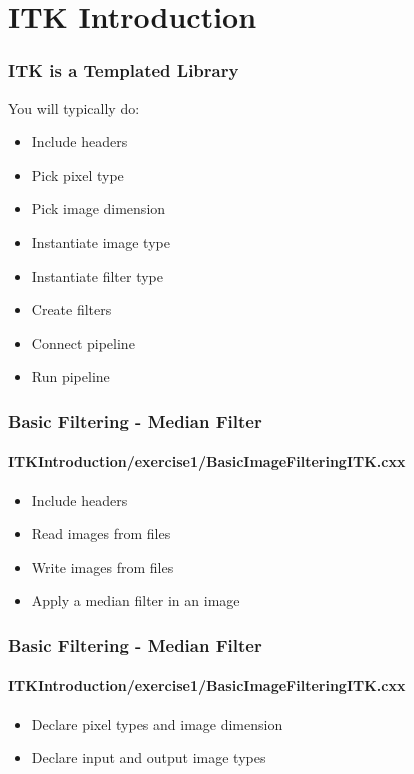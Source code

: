\section{ITK Introduction}



\begin{frame}
\frametitle{ITK is a Templated Library}
You will typically do:
\begin{itemize}
\item Include headers
\pause
\item Pick pixel type
\pause
\item Pick image dimension
\pause
\item Instantiate image type
\pause
\item Instantiate filter type
\pause
\item Create filters
\pause
\item Connect pipeline
\pause
\item Run pipeline
\end{itemize}
\end{frame}

{
\begin{frame}[fragile]
\frametitle{Basic Filtering - Median Filter}
\framesubtitle{ITKIntroduction/exercise1/BasicImageFilteringITK.cxx}
\begin{itemize}
\item Include headers
\end{itemize}
\pause
\begin{itemize}
\item Read images from files
\item Write images from files
\item Apply a median filter in an image
\end{itemize}
\end{frame}
}

{
\begin{frame}[fragile]
\frametitle{Basic Filtering - Median Filter}
\framesubtitle{ITKIntroduction/exercise1/BasicImageFilteringITK.cxx}
\begin{itemize}
\item Declare pixel types and image dimension
\end{itemize}
\pause
\begin{itemize}
\item Declare input and output image types
\end{itemize}
\end{frame}
}

